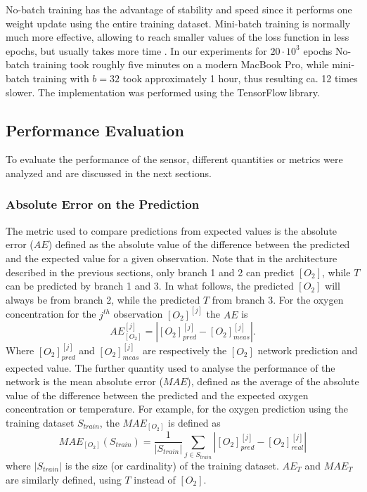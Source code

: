 \documentclass[9pt,twocolumn,twoside,pdftex]{optica}
\begin{document}
No-batch training has the advantage of stability and speed since it performs one weight update using the entire training dataset. Mini-batch training is normally much more effective, allowing to reach smaller values of the loss function in less epochs, but usually takes more time \cite{Michelucci2017}. In our experiments for $20 \cdot 10^3$ epochs No-batch training took roughly five minutes on a modern MacBook Pro, while mini-batch training with $b=32$ took approximately 1 hour, thus resulting ca. 12 times slower. 
The implementation was performed using the TensorFlow\texttrademark $\ $library. 


\subsection{Performance Evaluation}

To evaluate the performance of the sensor, different quantities or metrics were analyzed and are discussed in the next sections.


\subsubsection{Absolute Error on the Prediction}

The metric used to compare predictions from expected values is the absolute error ($AE$) defined as the absolute value of the difference between the predicted and the expected value for a given observation. Note that in the architecture described in the previous sections, only branch 1 and 2 can predict $[O_2]$, while $T$ can be predicted by branch 1 and 3. In what follows, the predicted $[O_2]$ will always be from branch 2, while the predicted $T$ from branch 3. For the oxygen concentration for the 
$j^{th}$ observation $[O_2]^{[j]}$  the $AE$ is 
\begin{equation}
\label{AE}
AE^{{[j]}}_{[O_2]} = |[O_2]^{{[j]}}_{pred}-[O_2]^{[j]}_{meas}|.
\end{equation}
Where $[O_2]^{{[j]}}_{pred}$ and $[O_2]^{{[j]}}_{meas}$ are respectively the $[O_2]$ network prediction and  expected value.
The further quantity used to analyse the performance of the network is the mean absolute error ($MAE$), defined as the average of the absolute value of the difference between the predicted and the expected oxygen concentration or temperature. For example, for the oxygen prediction using the training dataset $S_{train}$, the $MAE_{[O_2]}$ is defined as 
\begin{equation}
\label{MAE}
MAE_{[O_2]}(S_{train}) = \frac{1}{|S_{train}|} \sum_{j \in S_{train}}|[O_2]_{pred}^{[j]}-[O_2]_{real}^{[j]}|
\end{equation}
where $|S_{train}|$ is the size (or cardinality) of the training dataset. 
$AE_{T}$ and $MAE_T$ are similarly defined, using $T$ instead of $[O_2]$.
\end{document}
